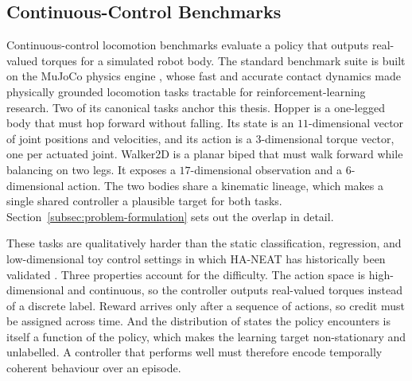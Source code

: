 \documentclass[12pt]{article}
\begin{document}
\subsection{Continuous-Control Benchmarks}
\label{subsec:control-benchmarks}


Continuous-control locomotion benchmarks evaluate a policy that outputs real-valued torques for a simulated robot body.
The standard benchmark suite \parencite{brockman_openai_2016,duan_benchmarking_2016} is built on the MuJoCo physics engine \parencite{todorov_mujoco_2012}, whose fast and accurate contact dynamics made physically grounded locomotion tasks tractable for reinforcement-learning research.
Two of its canonical tasks anchor this thesis.
Hopper is a one-legged body that must hop forward without falling. Its state is an $11$-dimensional vector of joint positions and velocities, and its action is a $3$-dimensional torque vector, one per actuated joint.
Walker2D is a planar biped that must walk forward while balancing on two legs. It exposes a $17$-dimensional observation and a $6$-dimensional action.
The two bodies share a kinematic lineage, which makes a single shared controller a plausible target for both tasks. Section~\ref{subsec:problem-formulation} sets out the overlap in detail.

These tasks are qualitatively harder than the static classification, regression, and low-dimensional toy control settings in which HA-NEAT has historically been validated \parencite{hagg_evolving_2017}.
Three properties account for the difficulty.
The action space is high-dimensional and continuous, so the controller outputs real-valued torques instead of a discrete label.
Reward arrives only after a sequence of actions, so credit must be assigned across time.
And the distribution of states the policy encounters is itself a function of the policy, which makes the learning target non-stationary and unlabelled.
A controller that performs well must therefore encode temporally coherent behaviour over an episode.
\end{document}
